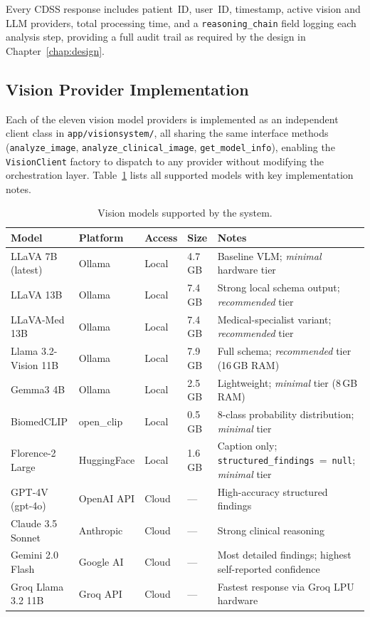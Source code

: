 \documentclass[12pt,a4paper]{report}
\begin{document}
Every CDSS response includes patient~ID, user~ID, timestamp, active
vision and LLM providers, total processing time, and a
\texttt{reasoning\_chain} field logging each analysis step, providing a
full audit trail as required by the design in Chapter~\ref{chap:design}.

\subsection{Vision Provider Implementation}
\label{subsec:vision_impl}

Each of the eleven vision model providers is implemented as an
independent client class in \texttt{app/visionsystem/}, all sharing the
same interface methods (\texttt{analyze\_image},
\texttt{analyze\_clinical\_image}, \texttt{get\_model\_info}), enabling
the \texttt{VisionClient} factory to dispatch to any provider without
modifying the orchestration layer.  Table~\ref{tab:vision_models} lists
all supported models with key implementation notes.

\begin{table}[H]
\centering
\caption{Vision models supported by the system.}
\label{tab:vision_models}
\small
\renewcommand{\arraystretch}{1.2}
\begin{tabularx}{\textwidth}{@{}l l l l X@{}}
\toprule
\textbf{Model} & \textbf{Platform} & \textbf{Access} & \textbf{Size} & \textbf{Notes} \\
\midrule
LLaVA 7B (latest)    & Ollama      & Local  & 4.7\,GB  & Baseline VLM; \textit{minimal} hardware tier \\
LLaVA 13B            & Ollama      & Local  & 7.4\,GB  & Strong local schema output; \textit{recommended} tier \\
LLaVA-Med 13B        & Ollama      & Local  & 7.4\,GB  & Medical-specialist variant; \textit{recommended} tier \\
Llama 3.2-Vision 11B & Ollama      & Local  & 7.9\,GB  & Full schema; \textit{recommended} tier (16\,GB RAM) \\
Gemma3 4B            & Ollama      & Local  & 2.5\,GB  & Lightweight; \textit{minimal} tier (8\,GB RAM) \\
BiomedCLIP           & open\_clip  & Local  & 0.5\,GB  & 8-class probability distribution; \textit{minimal} tier \\
Florence-2 Large     & HuggingFace & Local  & 1.6\,GB  & Caption only; \texttt{structured\_findings}~=~\texttt{null}; \textit{minimal} tier \\
GPT-4V (gpt-4o)      & OpenAI API  & Cloud  & ---      & High-accuracy structured findings \\
Claude 3.5 Sonnet    & Anthropic   & Cloud  & ---      & Strong clinical reasoning \\
Gemini 2.0 Flash     & Google AI   & Cloud  & ---      & Most detailed findings; highest self-reported confidence \\
Groq Llama 3.2 11B   & Groq API    & Cloud  & ---      & Fastest response via Groq LPU hardware \\
\bottomrule
\end{tabularx}
\end{table}
\end{document}
